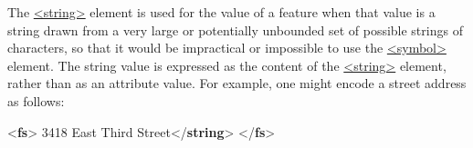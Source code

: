 The \hyperref[TEI.string]{<string>} element is used for the value of a feature when that value is a string drawn from a very large or potentially unbounded set of possible strings of characters, so that it would be impractical or impossible to use the \hyperref[TEI.symbol]{<symbol>} element. The string value is expressed as the content of the \hyperref[TEI.string]{<string>} element, rather than as an attribute value. For example, one might encode a street address as follows: \par\bgroup{}\exampleFont \begin{shaded}\noindent\mbox{}{<\textbf{fs}>}\mbox{}\newline 
{}\mbox{}\newline 
\hspace*{1em}3418 East Third Street{</\textbf{string}>}\mbox{}\newline 
{}\mbox{}\newline 
{</\textbf{fs}>}\end{shaded}\egroup\par \par
